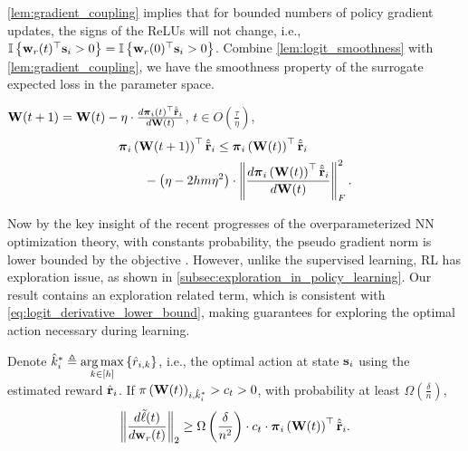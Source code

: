 \cref{lem:gradient_coupling} implies that for bounded numbers of policy gradient updates, the signs of the ReLUs will not change, i.e., ${\mathbb{I}}\left\{ {\mathbf{w}}_r(t)^\top {\mathbf{s}}_i > 0 \right\} = {\mathbb{I}}\left\{ {\mathbf{w}}_r(0)^\top {\mathbf{s}}_i > 0 \right\}$. Combine \cref{lem:logit_smoothness} with \cref{lem:gradient_coupling}, we have the smoothness property of the surrogate expected loss in the parameter space.
\begin{lem}
\label{lem:parameter_smoothness}
    ${\mathbf{W}}(t+1) = {\mathbf{W}}(t) - \eta \cdot \frac{d {\boldsymbol{\pi}}_i(t)^\top \hat{{\tilde{\mathbf{r}}}}_i}{d {\mathbf{W}}(t)}$, $t \in O\left( \frac{\tau}{\eta}\right)$,
\begin{equation}
\label{eq:parameter_smoothness}
\begin{split}
\small
    &\rvpi_i\left( \rmW(t+1) \right)^\top \hat{\rvtilder}_i \le \rvpi_i\left( \rmW(t) \right)^\top \hat{\rvtilder}_i \\
    &\qquad - \left( \eta - 2 h m \eta^2 \right) \cdot \left\| \frac{d \rvpi_i\left( \rmW(t) \right)^\top \hat{\rvtilder}_i}{d \rmW(t)} \right\|_F^2.
\end{split}
\end{equation}
\end{lem}

Now by the key insight of the recent progresses of the overparameterized NN optimization theory, with constants probability, the pseudo gradient norm is lower bounded by the objective \citep{li2018learning}. However, unlike the supervised learning, RL has exploration issue, as shown in \cref{subsec:exploration_in_policy_learning}. Our result contains an exploration related term, which is consistent with \cref{eq:logit_derivative_lower_bound}, making guarantees for exploring the optimal action necessary during learning.

\begin{lem}
\label{lem:gradient_lower_bound}
	Denote $\hat{k}_i^* \triangleq \operatorname*{arg\,max}\limits_{ k \in [h]}{\left\{ \hat{r}_{i, k} \right\}}$, i.e., the optimal action at state ${\mathbf{s}}_{i}$ using the estimated reward ${\hat{\mathbf{r}}}_i$. If $\pi\left({\mathbf{W}}(t)\right)_{i, \hat{k}_i^*} > c_t > 0$, with probability at least $\Omega\left( \frac{\delta}{n} \right)$,
\begin{equation*}
\begin{split}
	\left\| \frac{d\tilde{\ell}(t)}{d {\mathbf{w}}_r(t)} \right\|_2 \ge \Omega\left( \frac{\delta}{n^2} \right) \cdot c_t \cdot  {\boldsymbol{\pi}}_i\left( {\mathbf{W}}(t) \right)^\top \hat{{\tilde{\mathbf{r}}}}_{i}.
\end{split}
\end{equation*}
\end{lem}

